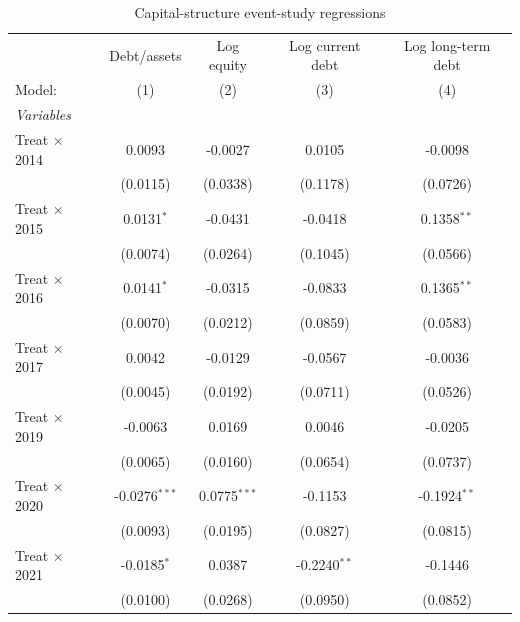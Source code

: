 \begin{table}[htbp]
   \caption{\label{tab:appendix_event_leverage} Capital-structure event-study regressions}
   \centering
   \scriptsize
   \begin{tabular}{lcccc}
      \tabularnewline \midrule \midrule
                              & Debt/assets     & Log equity      & Log current debt & Log long-term debt \\
      Model:                  & (1)             & (2)             & (3)              & (4) \\
      \midrule
      \emph{Variables} \\
      Treat $\times$ 2014     & 0.0093          & -0.0027         & 0.0105           & -0.0098 \\
                              & (0.0115)        & (0.0338)        & (0.1178)         & (0.0726) \\
      Treat $\times$ 2015     & 0.0131$^{*}$    & -0.0431         & -0.0418          & 0.1358$^{**}$ \\
                              & (0.0074)        & (0.0264)        & (0.1045)         & (0.0566) \\
      Treat $\times$ 2016     & 0.0141$^{*}$    & -0.0315         & -0.0833          & 0.1365$^{**}$ \\
                              & (0.0070)        & (0.0212)        & (0.0859)         & (0.0583) \\
      Treat $\times$ 2017     & 0.0042          & -0.0129         & -0.0567          & -0.0036 \\
                              & (0.0045)        & (0.0192)        & (0.0711)         & (0.0526) \\
      Treat $\times$ 2019     & -0.0063         & 0.0169          & 0.0046           & -0.0205 \\
                              & (0.0065)        & (0.0160)        & (0.0654)         & (0.0737) \\
      Treat $\times$ 2020     & -0.0276$^{***}$ & 0.0775$^{***}$  & -0.1153          & -0.1924$^{**}$ \\
                              & (0.0093)        & (0.0195)        & (0.0827)         & (0.0815) \\
      Treat $\times$ 2021     & -0.0185$^{*}$   & 0.0387          & -0.2240$^{**}$   & -0.1446 \\
                              & (0.0100)        & (0.0268)        & (0.0950)         & (0.0852) \\

\end{tabular}
\end{table}
